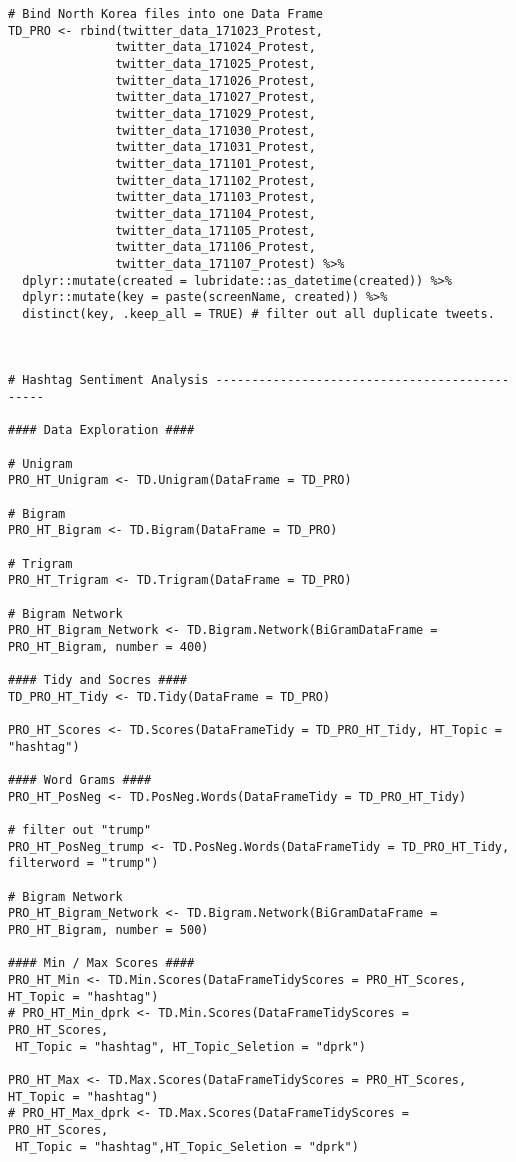 \begin{lstlisting}
# Bind North Korea files into one Data Frame
TD_PRO <- rbind(twitter_data_171023_Protest, 
               twitter_data_171024_Protest,
               twitter_data_171025_Protest,
               twitter_data_171026_Protest, 
               twitter_data_171027_Protest,
               twitter_data_171029_Protest, 
               twitter_data_171030_Protest, 
               twitter_data_171031_Protest, 
               twitter_data_171101_Protest, 
               twitter_data_171102_Protest, 
               twitter_data_171103_Protest, 
               twitter_data_171104_Protest, 
               twitter_data_171105_Protest, 
               twitter_data_171106_Protest, 
               twitter_data_171107_Protest) %>% 
  dplyr::mutate(created = lubridate::as_datetime(created)) %>% 
  dplyr::mutate(key = paste(screenName, created)) %>% 
  distinct(key, .keep_all = TRUE) # filter out all duplicate tweets.  



# Hashtag Sentiment Analysis ----------------------------------------------

#### Data Exploration ####

# Unigram
PRO_HT_Unigram <- TD.Unigram(DataFrame = TD_PRO)

# Bigram
PRO_HT_Bigram <- TD.Bigram(DataFrame = TD_PRO)

# Trigram
PRO_HT_Trigram <- TD.Trigram(DataFrame = TD_PRO)

# Bigram Network
PRO_HT_Bigram_Network <- TD.Bigram.Network(BiGramDataFrame = PRO_HT_Bigram, number = 400)

#### Tidy and Socres #### 
TD_PRO_HT_Tidy <- TD.Tidy(DataFrame = TD_PRO)

PRO_HT_Scores <- TD.Scores(DataFrameTidy = TD_PRO_HT_Tidy, HT_Topic = "hashtag")

#### Word Grams #### 
PRO_HT_PosNeg <- TD.PosNeg.Words(DataFrameTidy = TD_PRO_HT_Tidy)

# filter out "trump"
PRO_HT_PosNeg_trump <- TD.PosNeg.Words(DataFrameTidy = TD_PRO_HT_Tidy, filterword = "trump")

# Bigram Network
PRO_HT_Bigram_Network <- TD.Bigram.Network(BiGramDataFrame = PRO_HT_Bigram, number = 500)

#### Min / Max Scores #### 
PRO_HT_Min <- TD.Min.Scores(DataFrameTidyScores = PRO_HT_Scores, HT_Topic = "hashtag")
# PRO_HT_Min_dprk <- TD.Min.Scores(DataFrameTidyScores = PRO_HT_Scores, 
 HT_Topic = "hashtag", HT_Topic_Seletion = "dprk")

PRO_HT_Max <- TD.Max.Scores(DataFrameTidyScores = PRO_HT_Scores, HT_Topic = "hashtag")
# PRO_HT_Max_dprk <- TD.Max.Scores(DataFrameTidyScores = PRO_HT_Scores, 
 HT_Topic = "hashtag",HT_Topic_Seletion = "dprk")


\end{lstlisting}
